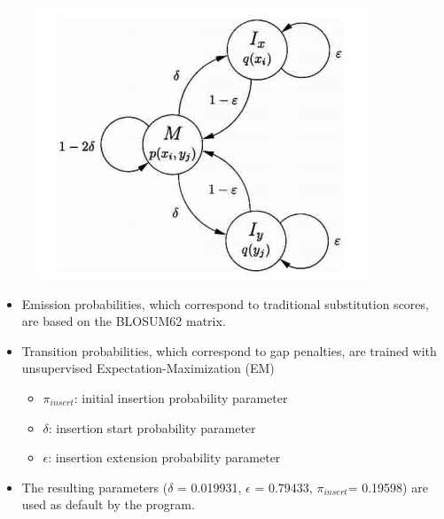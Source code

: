 \begin{frame}%
    \begin{figure}[t]
        \includegraphics[width=0.35\linewidth]{img/hmm_states.PNG}
    \end{figure}
    \begin{itemize}
        \item Emission probabilities, which correspond to traditional substitution scores, are based on the BLOSUM62 matrix.
        \item Transition probabilities, which correspond to gap penalties, are trained with unsupervised Expectation-Maximization (EM)
        \begin{itemize}
            \item $\pi_{insert}$: initial insertion probability parameter
            \item $\delta$: insertion start probability parameter
            \item $\epsilon$: insertion extension probability parameter
        \end{itemize}
        \item The resulting parameters ($\delta$ = 0.019931, $\epsilon$ = 0.79433, $\pi_{insert}$= 0.19598) are used as default by the program.
 \end{itemize}
\end{frame}

